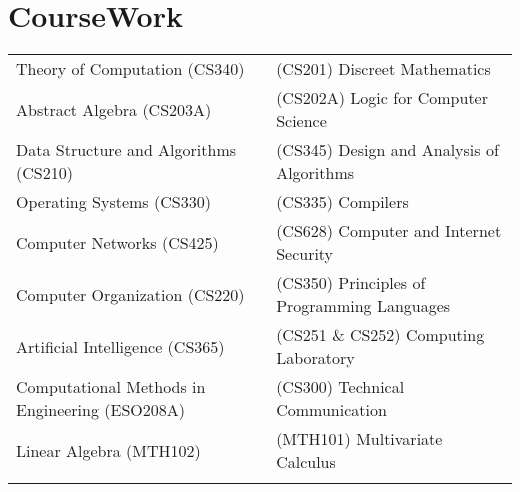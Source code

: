 \documentclass[a4paper,10pt]{article} %
\begin{document}
\section{CourseWork}

\begin{tabular}{>{\raggedleft}p{8cm}|p{8cm}}

    Theory of Computation (CS340) & (CS201) Discreet Mathematics \\
    Abstract Algebra (CS203A) & (CS202A) Logic for Computer Science \\
    Data Structure and Algorithms (CS210) & (CS345) Design and Analysis of Algorithms \\
    Operating Systems (CS330) & (CS335) Compilers \\
    Computer Networks (CS425) &  (CS628) Computer and Internet Security \\
    Computer Organization (CS220) & (CS350) Principles of Programming Languages \\
    Artificial Intelligence (CS365) & (CS251 \& CS252) Computing Laboratory \\
    Computational Methods in Engineering (ESO208A) & (CS300) Technical Communication \\
    Linear Algebra (MTH102) &  (MTH101) Multivariate Calculus \\
                     \\
\end{tabular}
\end{document}
